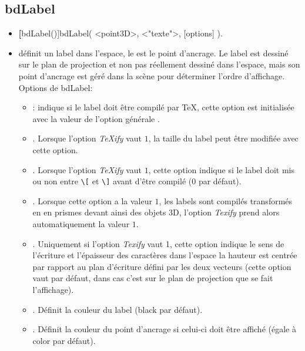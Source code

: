 \subsection{bdLabel}\label{macbdLabel}

\begin{itemize}
 \item \util \textbf[bdLabel()]{bdLabel( <point3D>, <"texte">, [options] )}.
 \item \desc définit un label dans l'espace, le  est le point d'ancrage. Le label est dessiné sur le plan de projection et non pas réellement dessiné dans l'espace, mais son point d'ancrage est géré dans la scène pour déterminer l'ordre d'affichage. Options de bdLabel: 

  \begin{itemize}
  \item {}: indique si le label doit être compilé par \TeX, cette option est initialisée avec la valeur de l'option générale .

  \item {}. Lorsque l'option \textit{TeXify} vaut $1$, la taille du label peut être modifiée avec cette option.

  \item {}. Lorsque l'option \textit{TeXify} vaut $1$, cette option indique si le label doit mis ou non entre \verb|\[| et \verb|\]| avant d'être compilé ($0$ par défaut).
  
  \item {}. Lorsque cette option a la valeur $1$, les labels sont compilés transformés en en prismes devant ainsi des objets 3D, l'option \textit{Texify} prend alors automatiquement la valeur $1$.
  
  \item {}. Uniquement si l'option \textit{Texify} vaut 1, cette option indique le sens de l'écriture et l'épaisseur des caractères dans l'espace la hauteur est centrée par rapport au plan d'écriture défini par les deux vecteurs (cette option vaut \Nil par défaut, dans cas c'est sur le plan de projection que se fait l'affichage).  

  \item {}. Définit la couleur du label (black par défaut).

  \item {}. Définit la couleur du point d'ancrage si celui-ci doit être affiché (égale à color par défaut).


\end{itemize}
\end{itemize}
